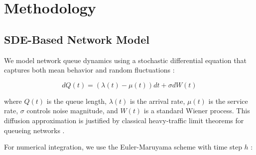 \documentclass{ieeeaccess}
\begin{document}
\begin{table}[t]
\caption{Network Congestion Modeling Approaches}
\label{tab:network_modeling}
\centering
{}
\end{table}

\section{Methodology}

\subsection{SDE-Based Network Model}

We model network queue dynamics using a stochastic differential equation that captures both mean
behavior and random fluctuations \cite{kloeden1992, khasminskii2012}:

\begin{equation}
    dQ(t) = (\lambda(t) - \mu(t))dt + \sigma dW(t)
    \label{eq:sde}
\end{equation}

\noindent where $Q(t)$ is the queue length, $\lambda(t)$ is the arrival rate, $\mu(t)$ is the
service rate, $\sigma$ controls noise magnitude, and $W(t)$ is a standard Wiener process. This
diffusion approximation is justified by classical heavy-traffic limit theorems for queueing
networks \cite{kang2007, whitt2002}.

For numerical integration, we use the Euler-Maruyama scheme with time step $h$
\cite{kloeden1992}:
\end{document}
